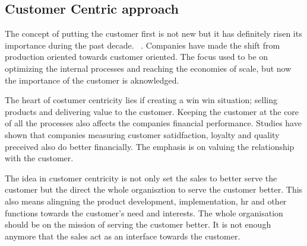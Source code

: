 \documentclass[12pt,a4paper,oneside,pdftex]{report}
\begin{document}
\subsection{Customer Centric approach}

The concept of putting the customer first is not new but it has definitely risen its importance during the past decade.  ~\citep{Shah}. Companies have made the shift from production oriented towards customer oriented. The focus used to be on optimizing the internal processes and reaching the economies of scale, but now the importance of the customer is aknowledged. 

The heart of costumer centricity lies if creating a win win situation; selling products and delivering value to the customer. \citep{Shah} Keeping the customer at the core of all the processes also affects the companies financial performance. Studies have shown that companies measuring customer satidfaction, loyalty and quality preceived also do better financially. The emphasis is on valuing the relationship with the customer. 

The idea in customer centricity is not only set the sales to better serve the customer but the direct the whole organisztion to serve the customer better. This also means alingning the product development, implementation, hr and other functions towards the customer's need and interests. The whole organisation should be on the mission of serving the customer better. It is not enough anymore that the sales act as an interface towards the customer. 
\newline
\end{document}
